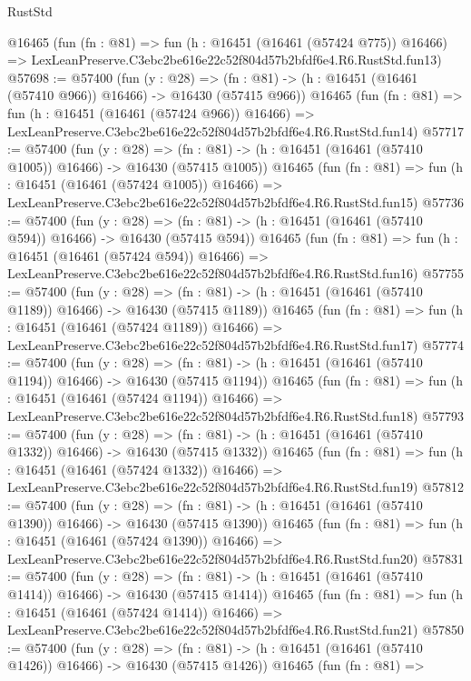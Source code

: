 \begin{lexlean}{RustStd}
\begin{coremodule}
    @16465
    (fun (fn : @81) =>
    fun (h : @16451 (@16461 (@57424 @775)) @16466) =>
    LexLeanPreserve.C3ebc2be616e22c52f804d57b2bfdf6e4.R6.RustStd.fun13)
@57698 := @57400
    (fun (y : @28) =>
    (fn : @81) -> (h : @16451 (@16461 (@57410 @966)) @16466) -> @16430 (@57415 @966))
    @16465
    (fun (fn : @81) =>
    fun (h : @16451 (@16461 (@57424 @966)) @16466) =>
    LexLeanPreserve.C3ebc2be616e22c52f804d57b2bfdf6e4.R6.RustStd.fun14)
@57717 := @57400
    (fun (y : @28) =>
    (fn : @81) -> (h : @16451 (@16461 (@57410 @1005)) @16466) -> @16430 (@57415 @1005))
    @16465
    (fun (fn : @81) =>
    fun (h : @16451 (@16461 (@57424 @1005)) @16466) =>
    LexLeanPreserve.C3ebc2be616e22c52f804d57b2bfdf6e4.R6.RustStd.fun15)
@57736 := @57400
    (fun (y : @28) =>
    (fn : @81) -> (h : @16451 (@16461 (@57410 @594)) @16466) -> @16430 (@57415 @594))
    @16465
    (fun (fn : @81) =>
    fun (h : @16451 (@16461 (@57424 @594)) @16466) =>
    LexLeanPreserve.C3ebc2be616e22c52f804d57b2bfdf6e4.R6.RustStd.fun16)
@57755 := @57400
    (fun (y : @28) =>
    (fn : @81) -> (h : @16451 (@16461 (@57410 @1189)) @16466) -> @16430 (@57415 @1189))
    @16465
    (fun (fn : @81) =>
    fun (h : @16451 (@16461 (@57424 @1189)) @16466) =>
    LexLeanPreserve.C3ebc2be616e22c52f804d57b2bfdf6e4.R6.RustStd.fun17)
@57774 := @57400
    (fun (y : @28) =>
    (fn : @81) -> (h : @16451 (@16461 (@57410 @1194)) @16466) -> @16430 (@57415 @1194))
    @16465
    (fun (fn : @81) =>
    fun (h : @16451 (@16461 (@57424 @1194)) @16466) =>
    LexLeanPreserve.C3ebc2be616e22c52f804d57b2bfdf6e4.R6.RustStd.fun18)
@57793 := @57400
    (fun (y : @28) =>
    (fn : @81) -> (h : @16451 (@16461 (@57410 @1332)) @16466) -> @16430 (@57415 @1332))
    @16465
    (fun (fn : @81) =>
    fun (h : @16451 (@16461 (@57424 @1332)) @16466) =>
    LexLeanPreserve.C3ebc2be616e22c52f804d57b2bfdf6e4.R6.RustStd.fun19)
@57812 := @57400
    (fun (y : @28) =>
    (fn : @81) -> (h : @16451 (@16461 (@57410 @1390)) @16466) -> @16430 (@57415 @1390))
    @16465
    (fun (fn : @81) =>
    fun (h : @16451 (@16461 (@57424 @1390)) @16466) =>
    LexLeanPreserve.C3ebc2be616e22c52f804d57b2bfdf6e4.R6.RustStd.fun20)
@57831 := @57400
    (fun (y : @28) =>
    (fn : @81) -> (h : @16451 (@16461 (@57410 @1414)) @16466) -> @16430 (@57415 @1414))
    @16465
    (fun (fn : @81) =>
    fun (h : @16451 (@16461 (@57424 @1414)) @16466) =>
    LexLeanPreserve.C3ebc2be616e22c52f804d57b2bfdf6e4.R6.RustStd.fun21)
@57850 := @57400
    (fun (y : @28) =>
    (fn : @81) -> (h : @16451 (@16461 (@57410 @1426)) @16466) -> @16430 (@57415 @1426))
    @16465
    (fun (fn : @81) =>

\end{coremodule}
\end{lexlean}

